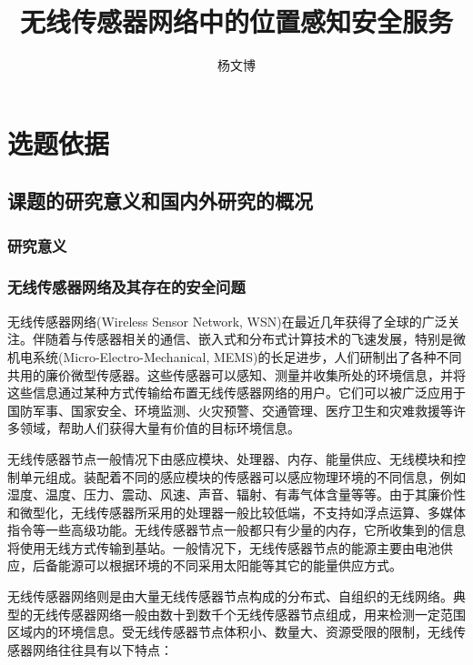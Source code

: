 \documentclass[a4paper,10pt]{article}
\title{无线传感器网络中的位置感知安全服务}
\author{杨文博}
\begin{document}
\maketitle

\section{ 选题依据 } 

\subsection{课题的研究意义和国内外研究的概况}

\subsubsection{研究意义}

\subsubsection{无线传感器网络及其存在的安全问题}  

无线传感器网络(Wireless Sensor Network, WSN)在最近几年获得了全球的广泛关注。伴随着与传感器相关的通信、嵌入式和分布式计算技术的飞速发展，特别是微机电系统(Micro-Electro-Mechanical, MEMS)的长足进步，人们研制出了各种不同共用的廉价微型传感器。这些传感器可以感知、测量并收集所处的环境信息，并将这些信息通过某种方式传输给布置无线传感器网络的用户。它们可以被广泛应用于国防军事、国家安全、环境监测、火灾预警、交通管理、医疗卫生和灾难救援等许多领域，帮助人们获得大量有价值的目标环境信息。

无线传感器节点一般情况下由感应模块、处理器、内存、能量供应、无线模块和控制单元组成。装配着不同的感应模块的传感器可以感应物理环境的不同信息，例如湿度、温度、压力、震动、风速、声音、辐射、有毒气体含量等等。由于其廉价性和微型化，无线传感器所采用的处理器一般比较低端，不支持如浮点运算、多媒体指令等一些高级功能。无线传感器节点一般都只有少量的内存，它所收集到的信息将使用无线方式传输到基站。一般情况下，无线传感器节点的能源主要由电池供应，后备能源可以根据环境的不同采用太阳能等其它的能量供应方式。

无线传感器网络则是由大量无线传感器节点构成的分布式、自组织的无线网络。典型的无线传感器网络一般由数十到数千个无线传感器节点组成，用来检测一定范围区域内的环境信息。受无线传感器节点体积小、数量大、资源受限的限制，无线传感器网络往往具有以下特点：
\end{document}
